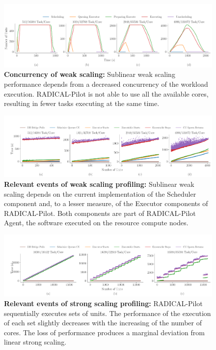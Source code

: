 \documentclass{article}
\begin{document}
\begin{figure}
  \centering
  \includegraphics[width=\textwidth]{figures/paper_titan_rp_synapse_weak_scaling_concurrency_horizontal.pdf}
  \caption{\textbf{Concurrency of weak scaling:} Sublinear weak scaling
  performance depends from a decreased concurrency of the workload execution.
  RADICAL-Pilot is not able to use all the available cores, resulting in
  fewer tasks executing at the same time.}\label{fig:ws-concurrency}
\end{figure}

\begin{figure}
  \centering
  \includegraphics[width=\textwidth]{figures/paper_titan_rp_synapse_weak_scaling_events_timeline_horizontal.pdf}
  \caption{\textbf{Relevant events of weak scaling profiling:} Sublinear weak
	scaling depends on the current implementation of the Scheduler component
	and, to a lesser measure, of the Executor components of RADICAL-Pilot.
	Both components are part of RADICAL-Pilot Agent, the software executed on
	the resource compute nodes. }\label{fig:ws-events}
\end{figure}

\begin{figure}
  \centering
  \includegraphics[width=\textwidth]{figures/paper_titan_rp_synapse_strong_scaling_events_timeline_horizontal.pdf}
  \caption{\textbf{Relevant events of strong scaling profiling:}
  RADICAL-Pilot sequentially executes sets of units. The performance of the
  execution of each set slightly decreases with the increasing of the number
  of cores. The loss of performance produces a marginal deviation from linear
  strong scaling.}\label{fig:ss-events}
\end{figure}
\end{document}

